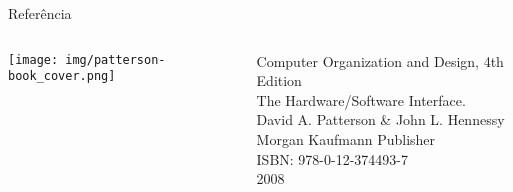 \begin{frame}{Referência}
  
  \begin{columns}
    \begin{column}{0.3\textwidth}
      
      \texttt{[image: img/patterson-book\_cover.png]}

    \end{column}
    \begin{column}{0.7\textwidth}
\small
      Computer Organization and Design, 4th Edition\\
      The Hardware/Software Interface.\\
      David A. Patterson  \&  John L. Hennessy \\
      Morgan Kaufmann Publisher\\
      ISBN: 978-0-12-374493-7\\
      2008
    \end{column}
  \end{columns}

\end{frame}
